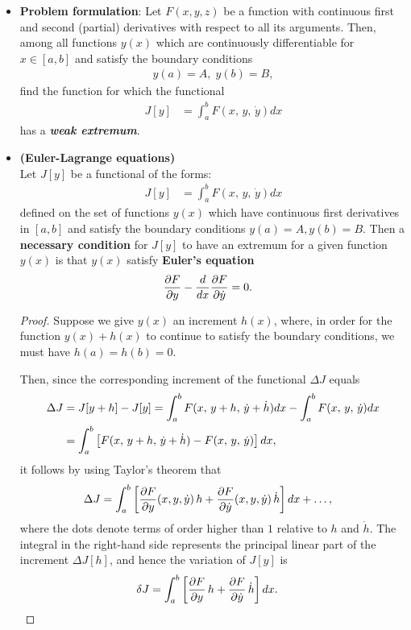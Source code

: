 \documentclass[11pt]{article}
\begin{document}
\begin{itemize}
\item \textbf{Problem formulation}: Let $F(x, y, z)$ be a function with continuous first and second (partial) derivatives with respect to all its arguments. Then, among
all functions $y(x)$ which are continuously differentiable for $x\in [a, b]$ and
satisfy the boundary conditions
\begin{align*}
y(a) = A, \;y(b) = B,
\end{align*} find the function for which the functional 
\begin{align}
J[y] &= \int_{a}^{b} F(x,\, y,\, \dot{y}) dx  \label{eqn: euler_lagrangian_problem}
\end{align} has a \textbf{\emph{weak extremum}}.

\item \begin{theorem} \textbf{(Euler-Lagrange equations)}  \citep{gelfand2000calculus}\\
Let $J[y]$ be a functional of the forms:
\begin{align}
J[y] &= \int_{a}^{b} F(x,\, y,\, \dot{y}) dx  \label{eqn: euler_lagrangian_problem2}
\end{align} defined on the set of functions $y(x)$ which have continuous first derivatives in $[a, b]$ and satisfy the boundary conditions $y(a) = A, y(b) = B$. Then
a \textbf{necessary condition} for $J[y]$ to have an extremum for a given function $y(x)$ is that $y(x)$ satisfy \textbf{Euler's equation}
\begin{align}
\frac{\partial F}{ \partial y} - \frac{d}{dx}\frac{\partial F}{ \partial \dot{y}} &= 0. \label{eqn: euler_lagrange}
\end{align}
\end{theorem}
\begin{proof}
Suppose we give $y(x)$ an increment $h(x)$, where, in order for the function
$y(x) + h(x)$
to continue to satisfy the boundary conditions, we must have $h(a) = h(b) = 0$.

Then, since the corresponding increment of the functional  $\Delta J$ equals
\begin{align*}
\Delta J &= J[y + h] - J[y] = \int_{a}^{b} F(x,\, y+h,\, \dot{y}+\dot{h}) dx - \int_{a}^{b} F(x,\, y,\, \dot{y}) dx\\
&= \int_{a}^{b} \left[F(x,\, y+h,\, \dot{y}+\dot{h}) - F(x,\, y,\, \dot{y}) \right]dx,
\end{align*}
it follows by using Taylor's theorem that
\begin{align*}
\Delta J &=  \int_{a}^{b} \left[\frac{\partial F}{ \partial y}(x, y, \dot{y})\,h + \frac{\partial F}{ \partial \dot{y}}(x, y, \dot{y})\,\dot{h}\right] dx + \ldots,
\end{align*} where  the dots denote terms of order higher than $1$ relative to $h$ and $\dot{h}$. The integral in the right-hand side represents the principal
linear part of the increment $\Delta J[h]$, and hence the variation of $J[y]$ is
\begin{align*}
\delta J  &=  \int_{a}^{b} \left[\frac{\partial F}{ \partial y}\,h + \frac{\partial F}{ \partial \dot{y}}\,\dot{h}\right] dx.
\end{align*}


\end{proof}
\end{itemize}
\end{document}
